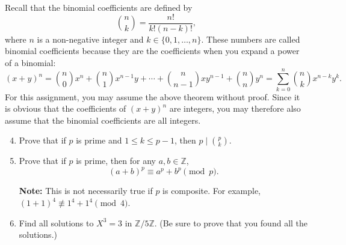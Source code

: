 \documentclass[12pt,reqno]{article}
\newcommand{\Z}{\mathbb{Z}}
\begin{document}
Recall that the binomial coefficients are defined by
\[\binom{n}{k} = \frac{n!}{k!(n-k)!},\]
where $n$ is a non-negative integer and $k\in\{0,1,\dotsc,n\}$. These numbers are called binomial coefficients because they are the coefficients when you expand a power of a binomial:
\[(x+y)^n = \binom{n}{0}x^n + \binom{n}{1}x^{n-1}y + \dotsb + \binom{n}{n-1}xy^{n-1} + \binom{n}{n}y^n = \sum_{k=0}^n \binom{n}{k} x^{n-k}y^k.\]
For this assignment, you may assume the above theorem without proof. Since it is obvious that the coefficients of $(x+y)^n$ are integers, you may therefore also assume that the binomial coefficients are all integers.

\begin{enumerate}
\setcounter{enumi}{3}

\item Prove that if $p$ is prime and $1 \leq k \leq p-1$, then $p \mid \binom{p}{k}$.


\item Prove that if $p$ is prime, then for any $a,b\in\Z$,
\[(a+b)^p \equiv a^p + b^p \pmod{p}.\]

\textbf{Note:} This is not necessarily true if $p$ is composite. For example, $(1+1)^4 \not\equiv 1^4 + 1^4 \pmod{4}$.


\item Find all solutions to $X^3 = 3$ in $\Z/5\Z$. (Be sure to prove that you found all the solutions.)


\end{enumerate}
\end{document}
